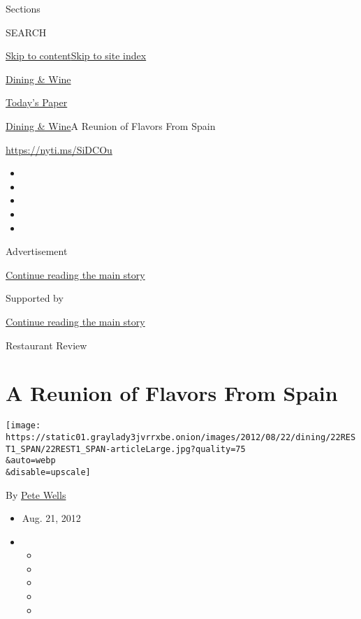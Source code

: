 Sections

SEARCH

\protect\hyperlink{site-content}{Skip to
content}\protect\hyperlink{site-index}{Skip to site index}

\href{https://www.nytimes3xbfgragh.onion/pages/dining/index.html}{Dining
\& Wine}

\href{https://myaccount.nytimes3xbfgragh.onion/auth/login?response_type=cookie\&client_id=vi}{}

\href{https://www.nytimes3xbfgragh.onion/section/todayspaper}{Today's
Paper}

\href{/pages/dining/index.html}{Dining \& Wine}\textbar{}A Reunion of
Flavors From Spain

\url{https://nyti.ms/SiDCOu}

\begin{itemize}
\item
\item
\item
\item
\item
\end{itemize}

Advertisement

\protect\hyperlink{after-top}{Continue reading the main story}

Supported by

\protect\hyperlink{after-sponsor}{Continue reading the main story}

Restaurant Review

\hypertarget{a-reunion-of-flavors-from-spain}{%
\section{A Reunion of Flavors From
Spain}\label{a-reunion-of-flavors-from-spain}}

\texttt{[image: https://static01.graylady3jvrrxbe.onion/images/2012/08/22/dining/22REST1\_SPAN/22REST1\_SPAN-articleLarge.jpg?quality=75\\\&auto=webp\\\&disable=upscale]}

By \href{https://www.nytimes3xbfgragh.onion/by/pete-wells}{Pete Wells}

\begin{itemize}
\item
  Aug. 21, 2012
\item
  \begin{itemize}
  \item
  \item
  \item
  \item
  \item
  \end{itemize}
\end{itemize}


